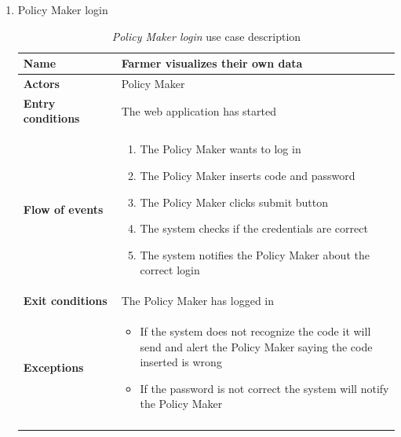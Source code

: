 \begin{enumerate}
    \item Policy Maker login
    \begin{longtable}{p{0.26\linewidth}p{0.75\linewidth}}
        \toprule
        \textbf{Name} & \textbf{Farmer visualizes their own data} \\
        \midrule
        \textbf{Actors} & Policy Maker \\
        \midrule
        \textbf{Entry conditions} & The web application has started\\
        \midrule
        \textbf{Flow of events} & 
        \begin{enumerate}
            \item The Policy Maker wants to log in 
            \item The Policy Maker inserts code and password
            \item The Policy Maker clicks submit button
            \item The system checks if the credentials are correct
            \item The system notifies the Policy Maker about the correct login
        \end{enumerate} \\
        \midrule
        \textbf{Exit conditions} & The Policy Maker has logged in\\
        \midrule
        \textbf{Exceptions} & 
        \begin{itemize}
            \item If the system does not recognize the code it will send and alert the Policy Maker saying the code inserted is wrong
            \item If the password is not correct the system will notify the Policy Maker 
        \end{itemize}\\
        \bottomrule
        \caption{\emph{Policy Maker login} use case description}
    \end{longtable}
    \begin{figure}[H]
        \begin{center}

\end{center}
\end{figure}
\end{enumerate}
